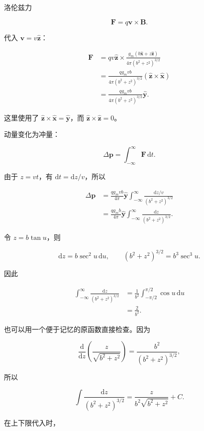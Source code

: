 \documentclass[12pt,a4paper,UTF8]{ctexart}
\begin{document}
洛伦兹力

\[\boldsymbol F=q\boldsymbol v\times\boldsymbol B.\]

代入 \(\boldsymbol v=v\hat{\boldsymbol z}\)：

\[\begin{aligned}
\boldsymbol F
&=qv\hat{\boldsymbol z}\times
\frac{g_m(b\hat{\boldsymbol x}+z\hat{\boldsymbol z})}
{4\pi(b^2+z^2)^{3/2}}\\
&=\frac{qg_mvb}{4\pi(b^2+z^2)^{3/2}}
(\hat{\boldsymbol z}\times\hat{\boldsymbol x})\\
&=\frac{qg_mvb}{4\pi(b^2+z^2)^{3/2}}
\hat{\boldsymbol y}.
\end{aligned} \tag{2}\]

这里使用了
\(\hat{\boldsymbol z}\times\hat{\boldsymbol x}=\hat{\boldsymbol y}\)，而
\(\hat{\boldsymbol z}\times\hat{\boldsymbol z}=0\)。

动量变化为冲量：

\[\Delta\boldsymbol p=\int_{-\infty}^{\infty}\boldsymbol F\,\mathrm dt.\]

由于 \(z=vt\)，有 \(\mathrm dt=\mathrm dz/v\)，所以

\[\begin{aligned}
\Delta\boldsymbol p
&=\frac{qg_mvb}{4\pi}\hat{\boldsymbol y}
\int_{-\infty}^{\infty}
\frac{\mathrm dz/v}{(b^2+z^2)^{3/2}}\\
&=\frac{qg_mb}{4\pi}\hat{\boldsymbol y}
\int_{-\infty}^{\infty}
\frac{\mathrm dz}{(b^2+z^2)^{3/2}}.
\end{aligned} \tag{3}\]

令 \(z=b\tan u\)，则

\[\mathrm dz=b\sec^2u\,\mathrm du,\qquad
(b^2+z^2)^{3/2}=b^3\sec^3u.\]

因此

\[\begin{aligned}
\int_{-\infty}^{\infty}
\frac{\mathrm dz}{(b^2+z^2)^{3/2}}
&=\frac1{b^2}\int_{-\pi/2}^{\pi/2}\cos u\,\mathrm du\\
&=\frac2{b^2}.
\end{aligned} \tag{4}\]

也可以用一个便于记忆的原函数直接检查。因为

\[\frac{\mathrm d}{\mathrm dz}
\left(\frac{z}{\sqrt{b^2+z^2}}\right)
=\frac{b^2}{(b^2+z^2)^{3/2}},\]

所以

\[\int\frac{\mathrm dz}{(b^2+z^2)^{3/2}}
=\frac{z}{b^2\sqrt{b^2+z^2}}+C.\]

在上下限代入时，
\end{document}
